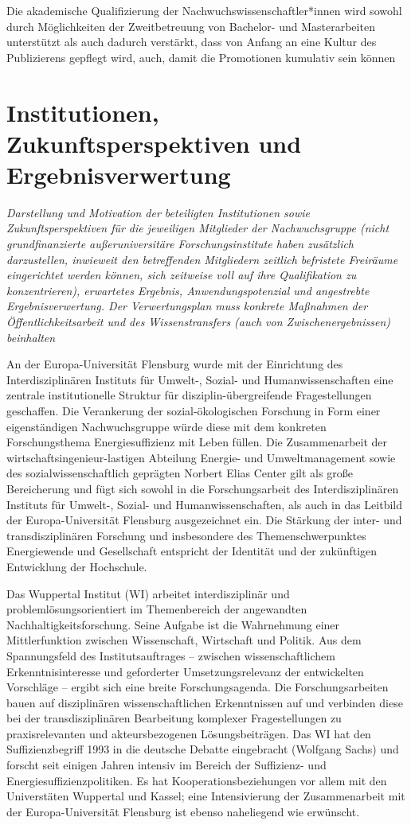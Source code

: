 \documentclass[a4paper,11pt,twoside]{scrartcl}
\begin{document}
Die akademische Qualifizierung der Nachwuchswissenschaftler*innen wird sowohl durch Möglichkeiten der Zweitbetreuung von Bachelor- und Masterarbeiten unterstützt als auch dadurch verstärkt, dass von Anfang an eine Kultur des Publizierens gepflegt wird, auch, damit  die Promotionen kumulativ sein können

\section{Institutionen, Zukunftsperspektiven und Ergebnisverwertung}
\textit{Darstellung und Motivation der beteiligten Institutionen sowie Zukunftsperspektiven für die jeweiligen Mitglieder der Nachwuchsgruppe (nicht grundfinanzierte außeruniversitäre Forschungsinstitute haben zusätzlich darzustellen, inwieweit den betreffenden Mitgliedern zeitlich befristete Freiräume eingerichtet werden können, sich zeitweise voll auf ihre Qualifikation zu konzentrieren), erwartetes Ergebnis, Anwendungspotenzial und angestrebte Ergebnisverwertung. Der Verwertungsplan muss konkrete Maßnahmen der Öffentlichkeitsarbeit und des Wissenstransfers (auch von Zwischenergebnissen) beinhalten}

An der Europa-Universität Flensburg wurde mit der Einrichtung des Interdisziplinären Instituts für Umwelt-, Sozial- und Humanwissenschaften eine zentrale institutionelle Struktur für disziplin-übergreifende Fragestellungen geschaffen. Die Verankerung der sozial-ökologischen Forschung in Form einer eigenständigen Nachwuchsgruppe würde diese mit dem konkreten Forschungsthema Energiesuffizienz mit Leben füllen. Die Zusammenarbeit der wirtschaftsingenieur-lastigen Abteilung Energie- und Umweltmanagement sowie des sozialwissenschaftlich geprägten Norbert Elias Center gilt als große Bereicherung und fügt sich sowohl in die Forschungsarbeit des Interdisziplinären Instituts für Umwelt-, Sozial- und Humanwissenschaften, als auch in das Leitbild der Europa-Universität Flensburg ausgezeichnet ein. Die Stärkung der inter- und transdisziplinären Forschung und insbesondere des Themenschwerpunktes Energiewende und Gesellschaft entspricht der Identität und der zukünftigen Entwicklung der Hochschule.

Das Wuppertal Institut (WI) arbeitet interdisziplinär und problemlösungsorientiert im Themenbereich der angewandten Nachhaltigkeitsforschung. Seine Aufgabe ist die Wahrnehmung einer Mittlerfunktion zwischen Wissenschaft, Wirtschaft und Politik. Aus dem Spannungsfeld des Institutsauftrages – zwischen wissenschaftlichem Erkenntnisinteresse und geforderter Umsetzungsrelevanz der entwickelten Vorschläge – ergibt sich eine breite Forschungsagenda. Die Forschungsarbeiten bauen auf disziplinären wissenschaftlichen Erkenntnissen auf und verbinden diese bei der transdisziplinären Bearbeitung komplexer Fragestellungen zu praxisrelevanten und akteursbezogenen Lösungsbeiträgen. Das WI hat den Suffizienzbegriff 1993 in die deutsche Debatte eingebracht (Wolfgang Sachs) und forscht seit einigen Jahren intensiv im Bereich der Suffizienz- und Energiesuffizienzpolitiken. Es hat Kooperationsbeziehungen vor allem mit den Universtäten Wuppertal und Kassel; eine Intensivierung der Zusammenarbeit mit der Europa-Universität Flensburg ist ebenso naheliegend wie erwünscht.
\end{document}
